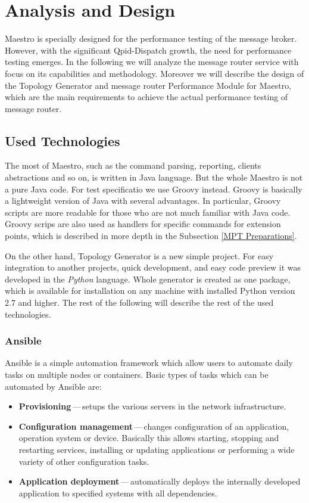 
\chapter{Analysis and Design}
\label{Analysis and Design}
Maestro is specially designed for the performance testing of the message broker. However, with the significant Qpid-Dispatch growth, the need for performance testing emerges. In the following we will analyze the message router service with focus on its capabilities and methodology. Moreover we will describe the design of the Topology Generator and message router Performance Module for Maestro, which are the main requirements to achieve the actual performance testing of message router.

\section{Used Technologies}
The most of Maestro, such as the command parsing, reporting, clients abstractions and so on, is written in Java language. But the whole Maestro is not a pure Java code. For test specificatio we use Groovy instead. Groovy is basically a lightweight version of Java with several advantages. In particular, Groovy scripts are more readable for those who are not much familiar with Java code. Groovy scrips are also used as handlers for specific commands for extension points, which is described in more depth in the Subsection \ref{MPT Preparations}.

On the other hand, Topology Generator is a new simple project. For easy integration to another projects, quick development, and easy code preview it was developed in the \emph{Python} language. Whole generator is created as one package, which is available for installation on any machine with installed Python version 2.7 and higher. The rest of the following will describe the rest of the used technologies.

\subsection{Ansible}
Ansible \cite{Ansible} is a simple automation framework which allow users to automate daily tasks on multiple nodes or containers. Basic types of tasks which can be automated by Ansible are:

\begin{itemize}
	\item \textbf{Provisioning}\,---\,setups the various servers in the network infrastructure.
	\item \textbf{Configuration management}\,---\,changes configuration of an application, operation system or device. Basically this allows starting, stopping and restarting services, installing or updating applications or performing a wide variety of other configuration tasks.
	\item \textbf{Application deployment}\,---\,automatically deploys the internally developed application to specified systems with all dependencies.
\end{itemize}

